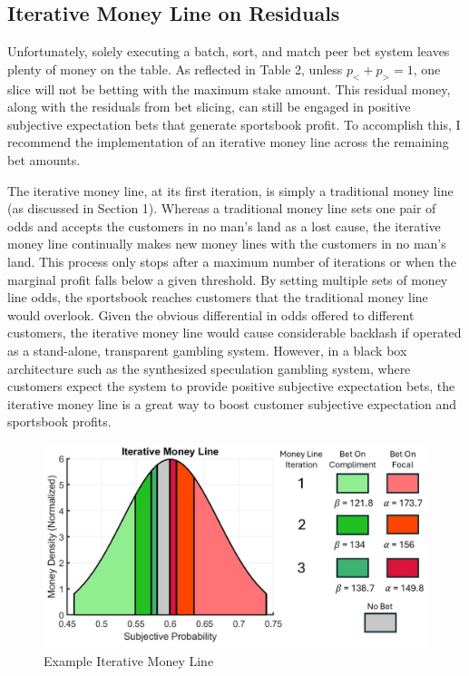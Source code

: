 \documentclass[sn-mathphys-num]{sn-jnl}
\theoremstyle{thmstyleone}%
\theoremstyle{thmstyletwo}%
\theoremstyle{thmstylethree}%
\begin{document}
\subsection{Iterative Money Line on Residuals}

Unfortunately, solely executing a batch, sort, and match peer bet system leaves plenty of money on the table. As reflected in Table 2, unless $p_< + p_> = 1$, one slice will not be betting with the maximum stake amount. This residual money, along with the residuals from bet slicing, can still be engaged in positive subjective expectation bets that generate sportsbook profit. To accomplish this, I recommend the implementation of an iterative money line across the remaining bet amounts. 

The iterative money line, at its first iteration, is simply a traditional money line (as discussed in Section 1). Whereas a traditional money line sets one pair of odds and accepts the customers in no man's land as a lost cause, the iterative money line continually makes new money lines with the customers in no man's land. This process only stops after a maximum number of iterations or when the marginal profit falls below a given threshold. By setting multiple sets of money line odds, the sportsbook reaches customers that the traditional money line would overlook. Given the obvious differential in odds offered to different customers, the iterative money line would cause considerable backlash if operated as a stand-alone, transparent gambling system. However, in a black box architecture such as the synthesized speculation gambling system, where customers expect the system to provide positive subjective expectation bets, the iterative money line is a great way to boost customer subjective expectation and sportsbook profits. 

\begin{figure}[H]
	\centering
	\includegraphics[width=12cm]{Iterative Money Line}
	\caption{Example Iterative Money Line}
\end{figure}
\end{document}
